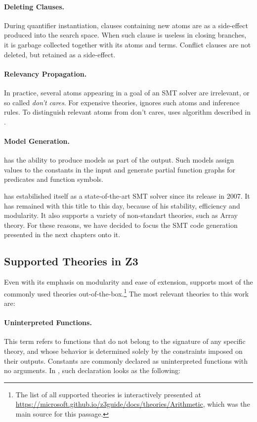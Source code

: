 \paragraph{Deleting Clauses.}
During quantifier instantiation, clauses containing new atoms are as a side-effect produced into the search space.
When such clause is useless in closing branches, it is garbage collected together with its atoms and terms.
Conflict clauses are not deleted, but retained as a side-effect.

\paragraph{Relevancy Propagation.}
In practice, several atoms appearing in a goal of an SMT solver are irrelevant, or so called \emph{don’t cares}.
For expensive theories, \ziii ignores such atoms and inference rules.
To distinguish relevant atoms from don’t cares, \ziii uses algorithm described in \cite{z3:rele}.

\paragraph{Model Generation.}
\ziii has the ability to produce models as part of the output.
Such models assign values to the constants in the input and generate partial function graphs for predicates and function symbols.

\gap

\ziii has estabilished itself as a state-of-the-art SMT solver since its release in 2007.
It has remained with this title to this day, because of his stability, efficiency and modularity.
It also supports a variety of non-standart theories, such as Array theory.
For these reasons, we have decided to focus the SMT code generation presented in the next chapters onto it.

\subsection{Supported Theories in Z3}

Even with its emphasis on modularity and ease of extension, \ziii supports most of the commonly used theories out-of-the-box.\footnote{
  The list of all supported theories is interactively presented at \url{https://microsoft.github.io/z3guide/docs/theories/Arithmetic}, which was the main source for this passage.
}
The most relevant theories to this work are:

\paragraph{Uninterpreted Functions.}
This term refers to functions that do not belong to the signature of any specific theory, and whose behavior is determined solely by the constraints imposed on their outputs.
Constants are commonly declared as uninterpreted functions with no arguments.
In \smtlib, such declaration looks as the following:

